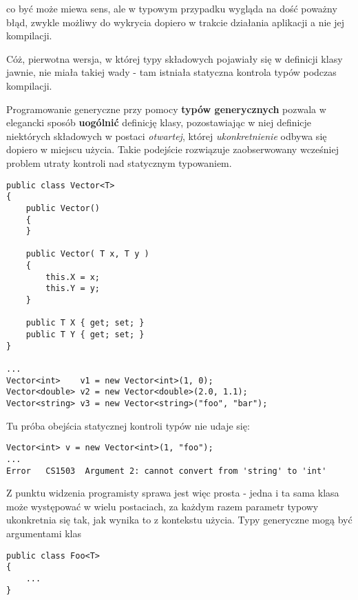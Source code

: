co być może miewa sens, ale w typowym przypadku wygląda na dość poważny błąd, zwykle możliwy do wykrycia dopiero
w trakcie działania aplikacji a nie jej kompilacji. 

Cóż, pierwotna wersja, w której typy składowych pojawiały się w definicji klasy jawnie, nie miała takiej wady -
tam istniała statyczna kontrola typów podczas kompilacji.

Programowanie generyczne przy pomocy {\bf typów generycznych} pozwala w elegancki sposób {\bf uogólnić} definicję
klasy, pozostawiając w niej definicje niektórych składowych w postaci {\em otwartej}, której {\em ukonkretnienie}
odbywa się dopiero w miejscu użycia. Takie podejście rozwiązuje zaobserwowany wcześniej problem utraty kontroli
nad statycznym typowaniem.

\begin{scriptsize}
\begin{verbatim}
public class Vector<T>
{
    public Vector()
    {
    }

    public Vector( T x, T y )
    {
        this.X = x;
        this.Y = y;
    }

    public T X { get; set; }
    public T Y { get; set; }
}

...
Vector<int>    v1 = new Vector<int>(1, 0);
Vector<double> v2 = new Vector<double>(2.0, 1.1);
Vector<string> v3 = new Vector<string>("foo", "bar");

\end{verbatim}
\end{scriptsize}

Tu próba obejścia statycznej kontroli typów nie udaje się:

\begin{scriptsize}
\begin{verbatim}
Vector<int> v = new Vector<int>(1, "foo");
...
Error	CS1503	Argument 2: cannot convert from 'string' to 'int'
\end{verbatim}
\end{scriptsize}

Z punktu widzenia programisty sprawa jest więc prosta - jedna i ta sama klasa może występować w wielu postaciach, za każdym
razem parametr typowy ukonkretnia się tak, jak wynika to z kontekstu użycia. Typy generyczne mogą być argumentami klas

\begin{scriptsize}
\begin{verbatim}
public class Foo<T>
{
    ...
}
\end{verbatim}
\end{scriptsize}

